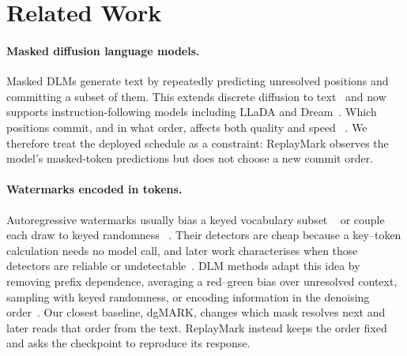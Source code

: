 \section{Related Work}
\label{sec:related}

\paragraph{Masked diffusion language models.}
Masked DLMs generate text by repeatedly predicting unresolved positions and committing a subset
of them. This extends discrete diffusion to text~\citep{ho2020ddpm,austin2021d3pm,
lou2024sedd,sahoo2024mdlm,shi2024simplified,ou2025radd} and now supports instruction-following
models including LLaDA and Dream~\citep{nie2025llada,zhu2025llada15,ye2025dream,
labs2025mercury}. Which positions commit, and in what order, affects both quality and speed
~\citep{arriola2025blockdiffusion,kim2025ordering,wu2026fastdllm,wei2026slowfast,
benhamu2025entropy,lee2026commitlocallyexitglobally}. We therefore treat the deployed schedule as
a constraint: ReplayMark observes the model's masked-token predictions but does not choose a new
commit order.

\paragraph{Watermarks encoded in tokens.}
Autoregressive watermarks usually bias a keyed vocabulary subset
~\citep{kirchenbauer2023watermark} or couple each draw to keyed randomness
~\citep{aaronson2023gpt,fu2024gumbelsoft,kuditipudi2024distortionfree}. Their detectors are cheap
because a key--token calculation needs no model call, and later work characterises when those
detectors are reliable or undetectable~\citep{kirchenbauer2024reliability,zhao2024provable,
christ2024undetectable}. DLM methods adapt this idea by removing prefix dependence, averaging a
red--green bias over unresolved context, sampling with keyed randomness, or encoding information
in the denoising order~\citep{chen2025orderagnostic,gloaguen2026watermarking,
bagchi2025discrete,wu2025dmark,raban2026lrdwm,hong2026dgmark}. Our closest baseline, dgMARK,
changes which mask resolves next and later reads that order from the text. ReplayMark instead
keeps the order fixed and asks the checkpoint to reproduce its response.

